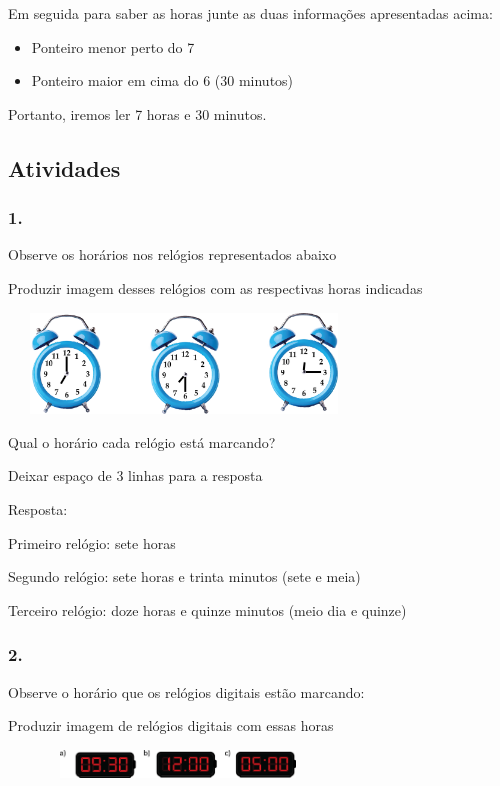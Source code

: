 Em seguida para saber as horas junte as duas informações apresentadas
acima:

\begin{itemize}
\item
  Ponteiro menor perto do 7
\item
  Ponteiro maior em cima do 6 (30 minutos)
\end{itemize}

Portanto, iremos ler 7 horas e 30 minutos.

\subsection{Atividades}\label{atividades-4}

\subsubsection{1.}\label{section-64}

Observe os horários nos relógios representados abaixo

Produzir imagem desses relógios com as respectivas horas indicadas

\includegraphics[width=3.66698in,height=1.05843in]{media/image51.png}

Qual o horário cada relógio está marcando?

Deixar espaço de 3 linhas para a resposta

Resposta:

Primeiro relógio: sete horas

Segundo relógio: sete horas e trinta minutos (sete e meia)

Terceiro relógio: doze horas e quinze minutos (meio dia e quinze)

\subsubsection{2.}\label{section-65}

Observe o horário que os relógios digitais estão marcando:

Produzir imagem de relógios digitais com essas horas

\includegraphics[width=3.54197in,height=0.29169in]{media/image52.png}

